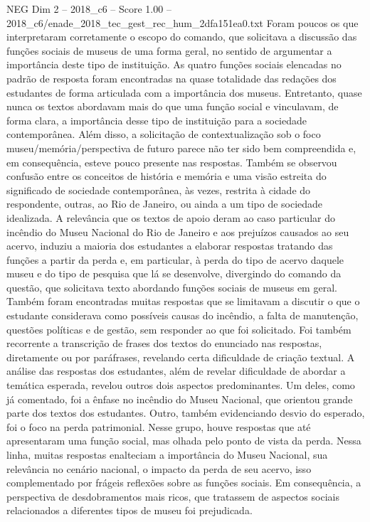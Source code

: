 \begin{textsample}{NEG Dim 2 – 2018\_c6 – Score 1.00 – 2018\_c6/enade\_2018\_tec\_gest\_rec\_hum\_2dfa151ea0.txt}
Foram poucos os que interpretaram corretamente o escopo do comando, que solicitava a discussão das funções sociais de museus de uma forma geral, no sentido de argumentar a importância deste tipo de instituição.
As quatro funções sociais elencadas no padrão de resposta foram encontradas na quase totalidade das redações dos estudantes de forma articulada com a importância dos museus.
Entretanto, quase nunca os textos abordavam mais do que uma função social e vinculavam, de forma clara, a importância desse tipo de instituição para a sociedade contemporânea.
Além disso, a solicitação de contextualização sob o foco museu/memória/perspectiva de futuro parece não ter sido bem compreendida e, em consequência, esteve pouco presente nas respostas.
Também se observou confusão entre os conceitos de história e memória e uma visão estreita do significado de sociedade contemporânea, às vezes, restrita à cidade do respondente, outras, ao Rio de Janeiro, ou ainda a um tipo de sociedade idealizada.
A relevância que os textos de apoio deram ao caso particular do incêndio do Museu Nacional do Rio de Janeiro e aos prejuízos causados ao seu acervo, induziu a maioria dos estudantes a elaborar respostas tratando das funções a partir da perda e, em particular, à perda do tipo de acervo daquele museu e do tipo de pesquisa que lá se desenvolve, divergindo do comando da questão, que solicitava texto abordando funções sociais de museus em geral.
Também foram encontradas muitas respostas que se limitavam a discutir o que o estudante considerava como possíveis causas do incêndio, a falta de manutenção, questões políticas e de gestão, sem responder ao que foi solicitado.
Foi também recorrente a transcrição de frases dos textos do enunciado nas respostas, diretamente ou por paráfrases, revelando certa dificuldade de criação textual.
A análise das respostas dos estudantes, além de revelar dificuldade de abordar a temática esperada, revelou outros dois aspectos predominantes.
Um deles, como já comentado, foi a ênfase no incêndio do Museu Nacional, que orientou grande parte dos textos dos estudantes.
Outro, também evidenciando desvio do esperado, foi o foco na perda patrimonial.
Nesse grupo, houve respostas que até apresentaram uma função social, mas olhada pelo ponto de vista da perda.
Nessa linha, muitas respostas enalteciam a importância do Museu Nacional, sua relevância no cenário nacional, o impacto da perda de seu acervo, isso complementado por frágeis reflexões sobre as funções sociais.
Em consequência, a perspectiva de desdobramentos mais ricos, que tratassem de aspectos sociais relacionados a diferentes tipos de museu foi prejudicada.

\end{textsample}
